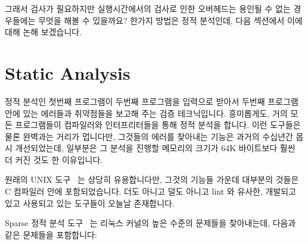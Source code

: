 그래서 검사가 필요하지만 실행시간에서의 검사로 인한 오버헤드는 용인될 수 없는
경우들에는 무엇을 해볼 수 있을까요?
한가지 방법은 정적 분석인데, 다음 섹션에서 이에 대해 논해 보겠습니다.

\section{Static Analysis}
\label{sec:debugging:Static Analysis}

정적 분석인 첫번째 프로그램이 두번째 프로그램을 입력으로 받아서 두번째 프로그램
안에 있는 에러들과 취약점들을 보고해 주는 검증 테크닉입니다.
흥미롭게도, 거의 모든 프로그램들이 컴파일러와 인터프리터들을 통해 정적 분석을
합니다.
이런 도구들은 물론 완벽과는 거리가 멉니다만, 그것들의 에러를 찾아내는 기능은
과거의 수십년간 몹시 개선되었는데, 일부분은 그 분석을 진행할 메모리의 크기가
64K 바이트보다 훨씬 더 커진 것도 한 이유입니다.

원래의 UNIX  도구~\cite{StephenJohnson1977lint} 는 상당히
유용합니다만, 그것의 기능들 가운데 대부분의 것들은 C 컴파일러 안에
포함되었습니다.
더도 아니고 덜도 아니고 lint 와 유사한, 개발되고 있고 사용되고 있는 도구들이
오늘날 존재합니다.

Sparse 정적 분석 도구~\cite{JonathanCorbet2004sparse} 는 리눅스 커널의 높은
수준의 문제들을 찾아내는데, 다음과 같은 문제들을 포함합니다:
\iffalse

